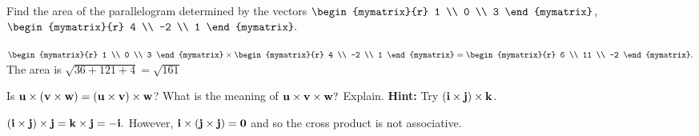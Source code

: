 \begin{enumialphparenastyle}
\begin{ex} Find the area of the parallelogram determined by the vectors
$\begin{mymatrix}{r}
1 \\
0 \\
3
\end{mymatrix} $, $\begin{mymatrix}{r}
4 \\
-2 \\
1
\end{mymatrix} .$
\begin{sol}
$\begin{mymatrix}{r}
1 \\
0 \\
3
\end{mymatrix} \times
\begin{mymatrix}{r}
4 \\
-2 \\
1
\end{mymatrix} =\begin{mymatrix}{r}
6 \\
11 \\
-2
\end{mymatrix} .$ The area is $\sqrt{36+121+4}= \sqrt{161}$
\end{sol}
\end{ex}


\begin{ex} Is ${\bf u}\times \left( {\bf v}\times {\bf w}\right) =\left( 
{\bf u}\times {\bf v}\right) \times {\bf w}$? What is the meaning of 
${\bf u}\times {\bf v}\times {\bf w}?$ Explain. 
\textbf{Hint: }Try $\left( {\bf i}\times {\bf j}
\right)\times {\bf k}$.
\begin{sol}
 $\left( {\bf i}\times {\bf j}\right) \times
{\bf j}={\bf k}\times {\bf j}=-{\bf i}.$ However, ${\bf i}\times \left( {\bf j}\times {\bf j}
\right) ={\bf 0}$ and so the cross product is not associative.
\end{sol}
\end{ex}


\end{enumialphparenastyle}
